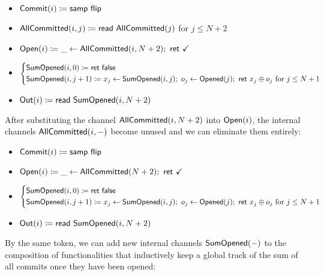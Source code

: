 \begin{itemize}
\item {\color{blue} $\mathsf{Commit}(i) \coloneqq \mathsf{samp} \ \mathsf{flip}$}
\item {\color{magenta} $\mathsf{AllCommitted}(i,j) \coloneqq \mathsf{read} \ \mathsf{AllCommitted}(j)$ for $j \leq N+2$}
\item {\color{teal} $\Open(i) \coloneqq \_ \leftarrow \AllCommitted(i,N+2); \ \ret{\checkmark}$}
\item {\color{red} $\begin{cases*} \SumOpened(i,0) \coloneqq \ret{\false} \\ \SumOpened(i,j+1) \coloneqq x_j \leftarrow \SumOpened(i,j); \ o_j \leftarrow \Opened(j); \ \ret{x_j \oplus o_j} \text{ for $j \leq N+1$} \end{cases*}$}
\item $\mathsf{Out}(i) \coloneqq \mathsf{read} \ \mathsf{SumOpened}(i,N+2)$
\end{itemize}

\noindent After substituting the channel $\mathsf{AllCommitted}(i,N+2)$ into $\mathsf{Open}(i)$, the internal channels $\mathsf{AllCommitted}(i,-)$ become unused and we can eliminate them entirely:

\begin{itemize}
\item {\color{blue} $\mathsf{Commit}(i) \coloneqq \mathsf{samp} \ \mathsf{flip}$}
\item {\color{teal} $\Open(i) \coloneqq \_ \leftarrow \AllCommitted(N+2); \ \ret{\checkmark}$}
\item {\color{red} $\begin{cases*} \SumOpened(i,0) \coloneqq \ret{\false} \\ \SumOpened(i,j+1) \coloneqq x_j \leftarrow \SumOpened(i,j); \ o_j \leftarrow \Opened(j); \ \ret{x_j \oplus o_j} \text{ for $j \leq N+1$} \end{cases*}$}
\item $\mathsf{Out}(i) \coloneqq \mathsf{read} \ \mathsf{SumOpened}(i,N+2)$
\end{itemize}

\noindent By the same token, we can add new internal channels $\mathsf{SumOpened}(-)$ to the composition of functionalities that inductively keep a global track of the sum of all commits once they have been opened:

